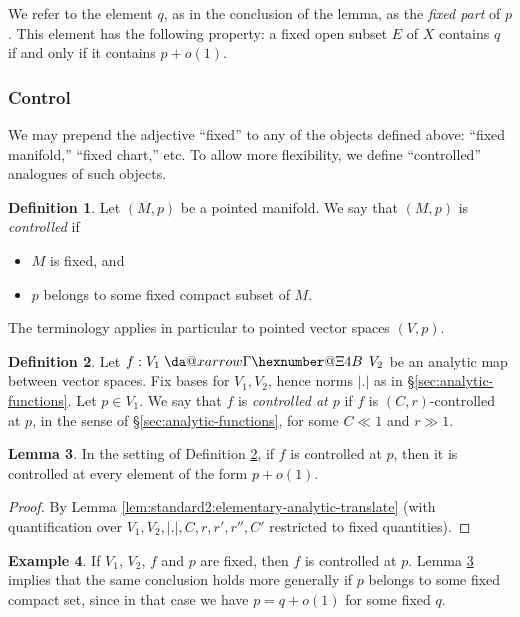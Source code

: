 \documentclass[reqno]{amsart}
\makeatletter
\newcommand*{\da@rightarrow}{\mathchar"0\hexnumber@\symAMSa 4B }
\newcommand*{\xdashrightarrow}[2][]{%
  \mathrel{%
    \mathpalette{\da@xarrow{#1}{#2}{}\da@rightarrow{\,}{}}{}%
  }%
}
\newcommand*{\da@xarrow}[7]{%
  \sbox0{$\ifx#7\scriptstyle\scriptscriptstyle\else\scriptstyle\fi#5#1#6\m@th$}%
  \sbox2{$\ifx#7\scriptstyle\scriptscriptstyle\else\scriptstyle\fi#5#2#6\m@th$}%
  \sbox4{$#7\dabar@\m@th$}%
  \dimen@=\wd0 %
  \ifdim\wd2 >\dimen@
    \dimen@=\wd2 %
  \fi
  \count@=2 %
  \def\da@bars{\dabar@\dabar@}%
  \@whiledim\count@\wd4<\dimen@\do{%
    \advance\count@\@ne
    \expandafter\def\expandafter\da@bars\expandafter{%
      \da@bars
      \dabar@ 
    }%
  }%
  \mathrel{#3}%
  \mathrel{%
    \mathop{\da@bars}\limits
    \ifx\\#1\\%
    \else
      _{\copy0}%
    \fi
    \ifx\\#2\\%
    \else
      ^{\copy2}%
    \fi
  }%
  \mathrel{#4}%
}
\theoremstyle{plain} \newtheorem{theorem} {Theorem}
\theoremstyle{definition} \newtheorem{definition} [theorem] {Definition}
\newtheorem{example} [theorem] {Example}
\theoremstyle{itplain} %
\newtheorem{lemma}[theorem]{Lemma}
\numberwithin{equation}{section}
\numberwithin{theorem}{section}
\makeatother
\begin{document}
We refer to the element $q$, as in the conclusion of the lemma, as the \emph{fixed part} of $p$.  This element has the following property: a fixed open subset $E$ of $X$ contains $q$ if and only if it contains $p + o(1)$.


\subsubsection{Control}\label{sec:control}
We may prepend the adjective ``fixed'' to any of the objects defined above: ``fixed manifold,'' ``fixed chart,'' etc.  To allow more flexibility, we define ``controlled'' analogues of such objects.

\begin{definition}\label{defn:standard2:emphc-point-manif}
  Let $(M,p)$ be a pointed manifold.  We say that $(M,p)$ is \emph{controlled} if
\begin{itemize}
\item $M$ is fixed, and
\item $p$ belongs to some fixed compact subset of $M$.
\end{itemize}
\end{definition}
The terminology applies in particular to pointed vector spaces $(V,p)$.

\begin{definition}\label{defn:standard2:let-f-controlled-at-p}
  Let $f : V_1 \xdashrightarrow{} V_2$ be an analytic map between vector spaces.  Fix bases for $V_1, V_2$, hence norms $|.|$ as in \S\ref{sec:analytic-functions}.  Let $p \in V_1$.  We say that $f$ is \emph{controlled at $p$} if $f$ is $(C,r)$-controlled at $p$, in the sense of \S\ref{sec:analytic-functions}, for some $C \ll 1$ and $r \gg 1$.
\end{definition}

\begin{lemma}\label{lem:standard2:sett-defin-refd}
  In the setting of Definition \ref{defn:standard2:let-f-controlled-at-p}, if $f$ is controlled at $p$, then it is controlled at every element of the form $p + o(1)$.
\end{lemma}
\begin{proof}
  By Lemma \ref{lem:standard2:elementary-analytic-translate} (with quantification over $V_1, V_2, |.|, C, r, r', r'', C'$ restricted to fixed quantities).
\end{proof}

\begin{example}\label{example:standard2:if-v_1-v_2}
  If $V_1$, $V_2$, $f$ and $p$ are fixed, then $f$ is controlled at $p$.  Lemma \ref{lem:standard2:sett-defin-refd} implies that the same conclusion holds more generally if $p$ belongs to some fixed compact set, since in that case we have $p = q + o(1)$ for some fixed $q$.
\end{example}
\end{document}
